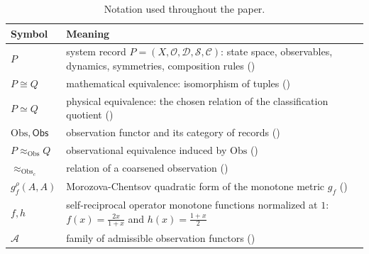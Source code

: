 \documentclass[11pt,letterpaper]{article}
\theoremstyle{definition}
\theoremstyle{remark}
\begin{document}
\begin{table}[htbp]
\centering
\small
\begin{tabularx}{\textwidth}{@{} L{0.22\textwidth} X @{}}
\toprule
Symbol & Meaning \\
\midrule
$P$ & system record $P = (X, \mathcal{O}, \mathcal{D}, \mathcal{S}, \mathcal{C})$: state space, observables, dynamics, symmetries, composition rules () \\
$P \cong Q$ & mathematical equivalence: isomorphism of tuples () \\
$P \simeq Q$ & physical equivalence: the chosen relation of the classification quotient () \\
$\mathrm{Obs}, \mathsf{Obs}$ & observation functor and its category of records () \\
$P \approx_{\mathrm{Obs}} Q$ & observational equivalence induced by $\mathrm{Obs}$ () \\
$\approx_{\mathrm{Obs}_c}$ & relation of a coarsened observation () \\
$g_f^{\rho}(A, A)$ & Morozova-Chentsov quadratic form of the monotone metric $g_f$ () \\
$f, h$ & self-reciprocal operator monotone functions normalized at $1$: $f(x) = \tfrac{2x}{1+x}$ and $h(x) = \tfrac{1+x}{2}$ \\
$\mathcal{A}$ & family of admissible observation functors () \\
\bottomrule
\end{tabularx}
\caption{Notation used throughout the paper.}
\label{tab:notation}
\end{table}
\end{document}
